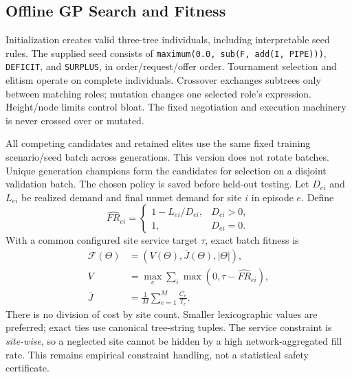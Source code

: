 \subsection{Offline GP Search and Fitness}
\label{subsec:gp-search}
Initialization creates valid three-tree individuals, including interpretable
seed rules. The supplied seed consists of
\texttt{maximum(0.0, sub(F, add(I, PIPE)))},
\texttt{DEFICIT}, and \texttt{SURPLUS}, in order/request/offer order.
Tournament selection and elitism operate on
complete individuals. Crossover exchanges subtrees only between matching
roles; mutation changes one selected role's expression. Height/node limits
control bloat. The fixed negotiation and execution machinery is never
crossed over or mutated.

All competing candidates and retained elites use the same fixed training
scenario/seed batch across generations. This version does not rotate batches.
Unique generation champions form the candidates for selection on a disjoint
validation batch. The chosen policy is saved before held-out testing.
Let $D_{ei}$ and $L_{ei}$ be realized demand and final unmet demand for
site $i$ in episode $e$. Define
\begin{equation}
 \widehat{FR}_{ei}=
 \begin{cases}
  1-L_{ei}/D_{ei},&D_{ei}>0,\\
  1,&D_{ei}=0.
 \end{cases}
\end{equation}
With a common configured site service target $\tau$, exact batch fitness is
\begin{align}
  \mathcal F(\Theta)&=
  \left(V(\Theta),\overline J(\Theta),|\Theta|\right),\\
  V&=\max_e\sum_i\max(0,\tau-\widehat{FR}_{ei}),\\
  \overline J&=\frac{1}{M}\sum_{e=1}^{M}\frac{C_e}{T_e}.
\end{align}
There is no division of cost by site count. Smaller lexicographic values
are preferred; exact ties use canonical tree-string tuples. The service
constraint is \emph{site-wise}, so a neglected site cannot be hidden by a high
network-aggregated fill rate. This remains empirical constraint handling,
not a statistical safety certificate.

